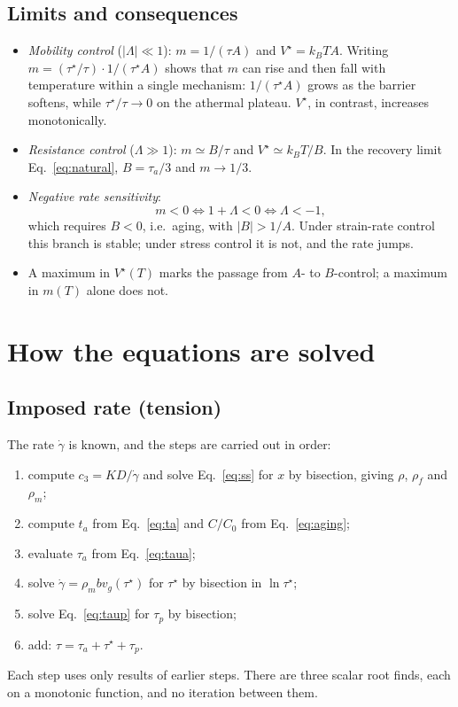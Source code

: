 \documentclass[11pt]{article}
\newcommand{\gd}{\dot\gamma}
\newcommand{\ts}{\tau^{\star}}
\newcommand{\kT}{k_BT}
\numberwithin{equation}{section}
\begin{document}
\subsection{Limits and consequences}
\begin{itemize}
\item \emph{Mobility control} ($|\Lambda|\ll1$): $m=1/(\tau A)$ and $V^\star=\kT A$. Writing $m=(\ts/\tau)\cdot1/(\ts A)$ shows that $m$ can rise and then fall with temperature within a single mechanism: $1/(\ts A)$ grows as the barrier softens, while $\ts/\tau\to0$ on the athermal plateau. $V^\star$, in contrast, increases monotonically.
\item \emph{Resistance control} ($\Lambda\gg1$): $m\simeq B/\tau$ and $V^\star\simeq\kT/B$. In the recovery limit Eq.~\eqref{eq:natural}, $B=\tau_a/3$ and $m\to1/3$.
\item \emph{Negative rate sensitivity}:
\begin{equation}
m<0\iff 1+\Lambda<0\iff\Lambda<-1 ,
\end{equation}
which requires $B<0$, i.e.\ aging, with $|B|>1/A$. Under strain-rate control this branch is stable; under stress control it is not, and the rate jumps.
\item A maximum in $V^\star(T)$ marks the passage from $A$- to $B$-control; a maximum in $m(T)$ alone does not.
\end{itemize}

\section{How the equations are solved}
\subsection{Imposed rate (tension)}
The rate $\gd$ is known, and the steps are carried out in order:
\begin{enumerate}
\item compute $c_3=KD/\gd$ and solve Eq.~\eqref{eq:ss} for $x$ by bisection, giving $\rho$, $\rho_f$ and $\rho_m$;
\item compute $t_a$ from Eq.~\eqref{eq:ta} and $C/C_0$ from Eq.~\eqref{eq:aging};
\item evaluate $\tau_a$ from Eq.~\eqref{eq:taua};
\item solve $\gd=\rho_mbv_g(\ts)$ for $\ts$ by bisection in $\ln\ts$;
\item solve Eq.~\eqref{eq:taup} for $\tau_p$ by bisection;
\item add: $\tau=\tau_a+\ts+\tau_p$.
\end{enumerate}
Each step uses only results of earlier steps. There are three scalar root finds, each on a monotonic function, and no iteration between them.
\end{document}
